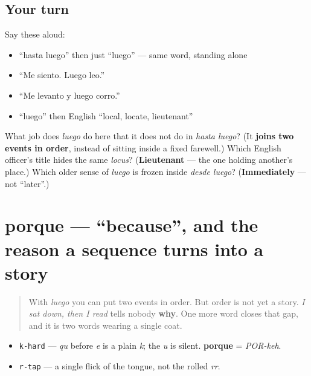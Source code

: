 \subsection*{Your turn}
Say these aloud:

\begin{itemize}
\raggedright
  \item \textquotedblleft{}hasta luego\textquotedblright{} then just \textquotedblleft{}luego\textquotedblright{} — same word, standing alone
  \item \textquotedblleft{}Me siento. Luego leo.\textquotedblright{}
  \item \textquotedblleft{}Me levanto y luego corro.\textquotedblright{}
  \item \textquotedblleft{}luego\textquotedblright{} then English \textquotedblleft{}local, locate, lieutenant\textquotedblright{}
\end{itemize}

\begin{tcolorbox}[breakable,colback=teal!4,colframe=teal!35!black,title={Before you move on}]
What job does \emph{luego} do here that it does not do in \emph{hasta luego}? (It \textbf{joins two events in order}, instead of sitting inside a fixed farewell.) Which English officer's title hides the same \emph{locus}? (\textbf{Lieutenant} — the one holding another's place.) Which older sense of \emph{luego} is frozen inside \emph{desde luego}? (\textbf{Immediately} — not \textquotedblleft{}later\textquotedblright{}.)
\end{tcolorbox}
\section[porque]{porque — \textquotedblleft{}because\textquotedblright{}, and the reason a sequence turns into a story}

\label{lesson:ES-C38-porque}



\begin{quote}
With \emph{luego} you can put two events in order. But order is not yet a story. \emph{I sat down, then I read} tells nobody \textbf{why}. One more word closes that gap, and it is two words wearing a single coat.
\end{quote}

\begin{sounds}
\begin{itemize}
\raggedright
  \item \texttt{k-hard} — \emph{qu} before \emph{e} is a plain \emph{k}; the \emph{u} is silent. \textbf{porque} = \emph{POR-keh}.
  \item \texttt{r-tap} — a single flick of the tongue, not the rolled \emph{rr}.
\end{itemize}
\end{sounds}

